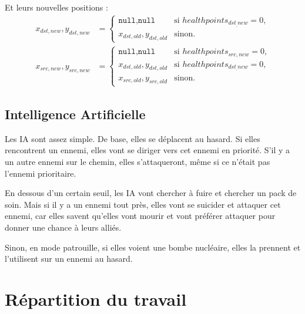\documentclass{article}
\begin{document}
Et leurs nouvelles positions : 
\begin{align}
     x_{dst,new},y_{dst,new} &=
     \begin{cases}
        \texttt{null},\texttt{null} & \text{si } healthpoints_{dst_,new} = 0 \text{,}\\
        x_{dst,old},y_{dst,old} & \text{sinon.} 
     \end{cases} \\
     x_{src,new},y_{src,new} &=
     \begin{cases}
        \texttt{null},\texttt{null} & \text{si } healthpoints_{src,new} = 0 \text{,}\\
        x_{dst,old},y_{dst,old} & \text{si } healthpoints_{dst_,new} = 0 \text{,}\\
        x_{src,old},y_{src,old} & \text{sinon.} 
     \end{cases}
\end{align}

\subsection{Intelligence Artificielle}
Les IA sont assez simple. De base, elles se déplacent au hasard.
Si elles rencontrent un ennemi, elles vont se diriger vers cet ennemi en priorité. S'il y a un
autre ennemi sur le chemin, elles s'attaqueront, même si ce n'était pas l'ennemi prioritaire.

En dessous d'un certain seuil, les IA vont chercher à fuire et chercher un pack de soin. Mais si il y a un ennemi
tout près, elles vont se suicider et attaquer cet ennemi, car elles savent qu'elles vont mourir et vont préférer attaquer 
pour donner une chance à leurs alliés.

Sinon, en mode patrouille, si elles voient une bombe nucléaire, elles la prennent et l'utilisent sur un ennemi au hasard.
\section{Répartition du travail}
\end{document}
